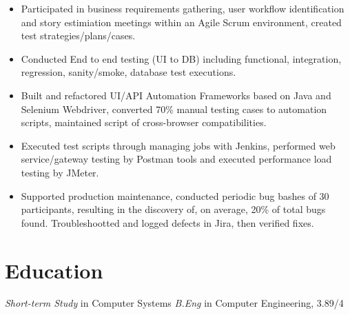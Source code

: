 \documentclass{resume}
\begin{document}
\begin{itemize}
  \item Participated in business requirements gathering, user workflow identification and story estimiation meetings within an Agile Scrum environment, created test strategies/plans/cases.
  \item Conducted End to end testing (UI to DB) including functional, integration, regression, sanity/smoke, database test executions. 
  \item Built and refactored UI/API Automation Frameworks based on Java and Selenium Webdriver, converted 70\% manual testing cases to automation scripts, maintained script of cross-browser compatibilities.
  \item Executed test scripts through managing jobs with Jenkins, performed web service/gateway testing by Postman tools and executed performance load testing by JMeter.
  \item Supported production maintenance, conducted periodic bug bashes of 30 participants, resulting in the discovery of, on average, 20\% of total bugs found. Troubleshootted and logged defects in Jira, then verified fixes.
\end{itemize}



\section{Education}
\textit{Short-term Study} in Computer Systems
\textit{B.Eng} in Computer Engineering, 3.89/4


%
%
\end{document}
